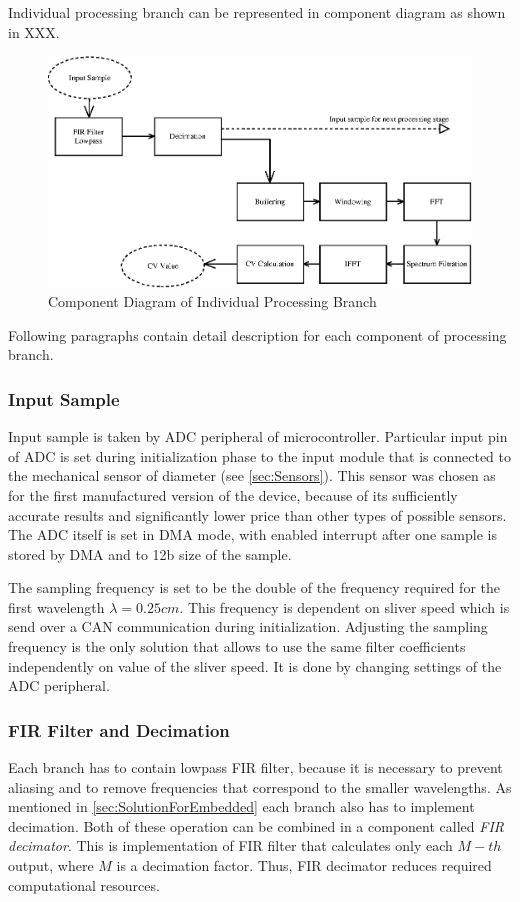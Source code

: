 \documentclass[twoside]{ctuthesis}
\theoremstyle{plain}
\theoremstyle{definition}
\theoremstyle{note}
\begin{document}
Individual processing branch can be represented in component diagram as shown in XXX.

\begin{figure}[h]
	\centering
	\includegraphics[width=1.0\textwidth]{sliver_singleBranch.eps}
	\caption{Component Diagram of Individual Processing Branch}
	\label{fig:singleBranch}
\end{figure}

Following paragraphs contain detail description for each component of processing branch.

\subsubsection{Input Sample}
Input sample is taken by ADC peripheral of microcontroller. Particular input pin of ADC is set during initialization phase to the input module that is connected to the mechanical sensor of diameter (see \ref{sec:Sensors}). This sensor was chosen as for the first manufactured version of the device, because of its sufficiently accurate results and significantly lower price than other types of possible sensors. The ADC itself is set in DMA mode, with enabled interrupt after one sample is stored by DMA and to 12b size of the sample.

The sampling frequency is set to be the double of the frequency required for the first wavelength $\lambda=0.25 cm$. This frequency is dependent on sliver speed which is send over a CAN communication during initialization. Adjusting the sampling frequency is the only solution that allows to use the same filter coefficients independently on value of the sliver speed. It is done by changing settings of the ADC peripheral.

\subsubsection{FIR Filter and Decimation}
Each branch has to contain lowpass FIR filter, because it is necessary to prevent aliasing and to remove frequencies that correspond to the smaller wavelengths. As mentioned in \ref{sec:SolutionForEmbedded} each branch also has to implement decimation. Both of these operation can be combined in a component called \textit{FIR decimator}. This is implementation of FIR filter that calculates only each $M-th$ output, where $M$ is a decimation factor. Thus, FIR decimator reduces required computational resources. 
\end{document}
